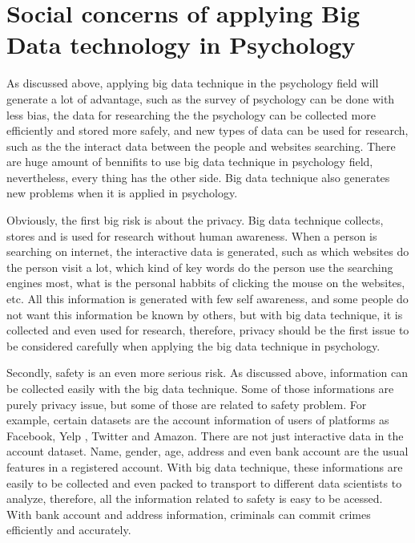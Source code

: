 \section{Social concerns of applying Big Data 
technology in Psychology}

As discussed above, applying big data technique in the psychology 
field will generate a lot of advantage, such as the survey of 
psychology can be done with less bias, the data for researching the
the psychology can be collected more efficiently and stored more 
safely, and new types of data can be used for research, such as the
the interact data between the people and websites searching. 
There are huge amount of bennifits to use big data technique in 
psychology field, nevertheless, every thing has the other side. Big
data technique also generates new problems when it is applied in 
psychology. 

Obviously, the first big risk is about the privacy. Big data 
technique collects, stores and is used for research without human 
awareness. When a person is searching on internet, the interactive
data is generated, such as which websites do the person visit a 
lot, which kind of key words do the person use the searching 
engines most, what is the personal habbits of clicking the mouse on 
the websites, etc. All this information is generated with few self
awareness, and some people do not want this information be known by
others, but with big data technique, it is collected and even used 
for research, therefore, privacy should be the first issue to be 
considered carefully when applying the big data technique in 
psychology. 

Secondly, safety is an even more serious risk. As discussed above, 
information can be collected easily with the big data technique. 
Some of those informations are purely privacy issue, but some of 
those are related to safety problem. For example, certain datasets 
are the account information of users of platforms as Facebook, Yelp
, Twitter and Amazon. There are not just interactive data in the 
account dataset. Name, gender, age, address and even bank account
are the usual features in a registered account. With big data 
technique, these informations are easily to be collected and even
packed to transport to different data scientists to analyze, 
therefore, all the information related to safety is easy to be 
acessed. With bank account and address information, criminals can
commit crimes efficiently and accurately.

